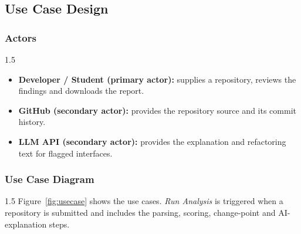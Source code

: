 \documentclass[12pt,a4paper]{article}
\begin{document}
\subsection{Use Case Design}
\label{sec:usecase}

\subsubsection{Actors}

\begin{spacing}{1.5}
\justifying
\begin{itemize}[leftmargin=*,itemsep=2pt]
  \item \textbf{Developer / Student (primary actor):} supplies a repository,
        reviews the findings and downloads the report.

  \item \textbf{GitHub (secondary actor):} provides the repository source
        and its commit history.

  \item \textbf{LLM API (secondary actor):} provides the explanation and
        refactoring text for flagged interfaces.
\end{itemize}
\end{spacing}

\subsubsection{Use Case Diagram}

\begin{spacing}{1.5}
\justifying
Figure~\ref{fig:usecase} shows the use cases. \emph{Run Analysis} is
triggered when a repository is submitted and includes the parsing, scoring,
change-point and AI-explanation steps.
\end{spacing}
\end{document}
